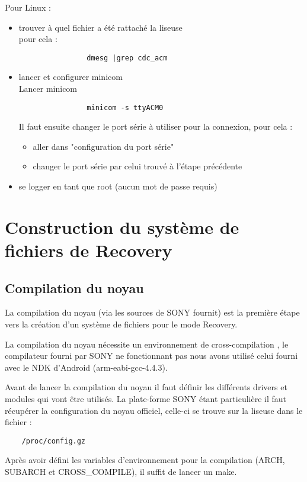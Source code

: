 Pour Linux : 
\begin{itemize}
	\item trouver à quel fichier a été rattaché la liseuse \\
		pour cela : 
			\begin{verbatim}
				dmesg |grep cdc_acm
			\end{verbatim}
	\item lancer et configurer minicom \\
		Lancer minicom\\
			\begin{verbatim}
				minicom -s ttyACM0
			\end{verbatim}
		Il faut ensuite changer le port série à utiliser pour la connexion, pour cela : \\	
		\begin{itemize}
			\item aller dans "configuration du port série"
			\item changer le port série par celui trouvé à l'étape précédente
		\end{itemize}
	\item se logger en tant que root (aucun mot de passe requis)
\end{itemize}

\section{Construction du système de fichiers de Recovery}
\subsection{Compilation du noyau}

La compilation du noyau (via les sources de SONY fournit) est la première étape vers la création d'un système de fichiers pour le mode Recovery.

La compilation du noyau nécessite un environnement de cross-compilation , le compilateur fourni par SONY ne fonctionnant pas nous avons utilisé celui fourni avec le NDK d'Android (arm-eabi-gcc-4.4.3).

Avant de lancer la compilation du noyau il faut définir les différents drivers et modules qui vont être utilisés. La plate-forme SONY étant particulière il faut récupérer la configuration du noyau officiel, celle-ci se trouve sur la liseuse dans le fichier : 
\begin{verbatim}
	/proc/config.gz
\end{verbatim}
 Après avoir défini les variables d'environnement pour la compilation (ARCH, SUBARCH et CROSS_COMPILE), il suffit de lancer un make.
 
